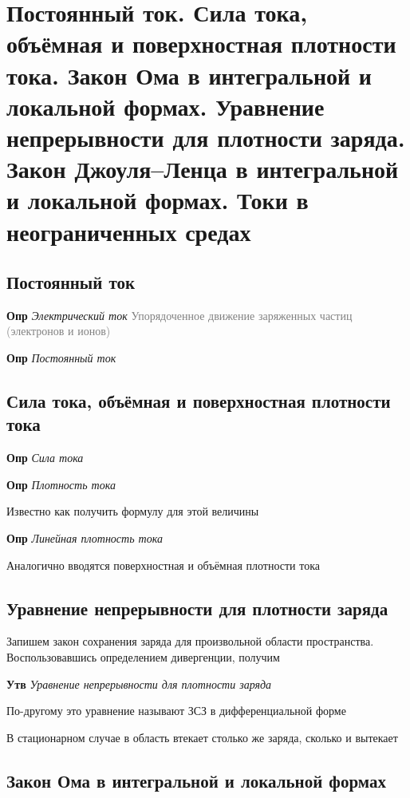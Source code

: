 \documentclass[a4paper, 14pt]{article}
\begin{document}
    \section{Постоянный ток.
    Сила тока, объёмная и поверхностная плотности тока.
    Закон Ома в интегральной и локальной формах.
    Уравнение непрерывности для плотности заряда.
    Закон Джоуля–Ленца в интегральной и локальной формах.
    Токи в неограниченных средах}
    
    \subsection{Постоянный ток}
    
    \textbf{Опр} \textit{Электрический ток}
    \textcolor{gray}{Упорядоченное движение заряженных частиц (электронов и ионов)}
   
    \textbf{Опр} \textit{Постоянный ток}
    
    \subsection{Сила тока, объёмная и поверхностная плотности тока}
    
    \textbf{Опр} \textit{Сила тока}
    
    \textbf{Опр} \textit{Плотность тока}
    
    Известно как получить формулу для этой величины
    
    \textbf{Опр} \textit{Линейная плотность тока}
    
    Аналогично вводятся поверхностная и объёмная плотности тока
    
    \subsection{Уравнение непрерывности для плотности заряда}
    
    Запишем закон сохранения заряда для произвольной области пространства.
    Воспользовавшись определением дивергенции, получим
    
    \textbf{Утв} \textit{Уравнение непрерывности для плотности заряда}
    
    По-другому это уравнение называют ЗСЗ в дифференциальной форме
    
    В стационарном случае в область втекает столько же заряда, сколько и вытекает
    
    \subsection{Закон Ома в интегральной и локальной формах}
    
\end{document}
